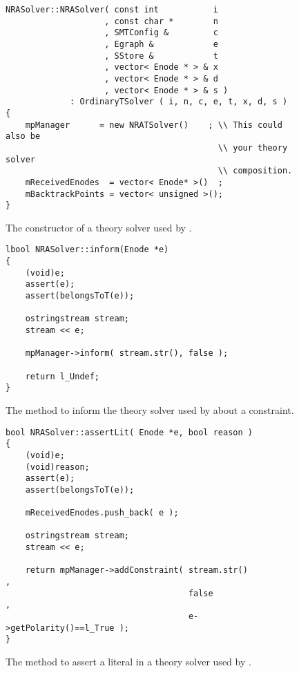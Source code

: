 \begin{figure}[htb]
\caption{The constructor of a theory solver used by \opensmt.}
\label{fig:constructornrasolver}
\begin{verbatim}
NRASolver::NRASolver( const int           i
                    , const char *        n
                    , SMTConfig &         c
                    , Egraph &            e
                    , SStore &            t
                    , vector< Enode * > & x
                    , vector< Enode * > & d
                    , vector< Enode * > & s )
             : OrdinaryTSolver ( i, n, c, e, t, x, d, s )
{
    mpManager      = new NRATSolver()    ; \\ This could also be
                                           \\ your theory solver
                                           \\ composition.
    mReceivedEnodes	 = vector< Enode* >()  ;
    mBacktrackPoints = vector< unsigned >();
}
\end{verbatim}
\end{figure}


\begin{figure}[htb]
\caption{The method to inform the theory solver used by \opensmt about a constraint.}
\label{fig:informnrasolver}
\begin{verbatim}
lbool NRASolver::inform(Enode *e)
{
    (void)e;
    assert(e);
    assert(belongsToT(e));

    ostringstream stream;
    stream << e;

    mpManager->inform( stream.str(), false );

    return l_Undef;
}
\end{verbatim}
\end{figure}

\begin{figure}[htb]
\caption{The method to assert a literal in a theory solver used by \opensmt.}
\label{fig:assertLitnrasolver}
\begin{verbatim}
bool NRASolver::assertLit( Enode *e, bool reason )
{
    (void)e;
    (void)reason;
    assert(e);
    assert(belongsToT(e));

    mReceivedEnodes.push_back( e );

    ostringstream stream;
    stream << e;

    return mpManager->addConstraint( stream.str()            , 
                                     false                   , 
                                     e->getPolarity()==l_True );
}
\end{verbatim}
\end{figure}


